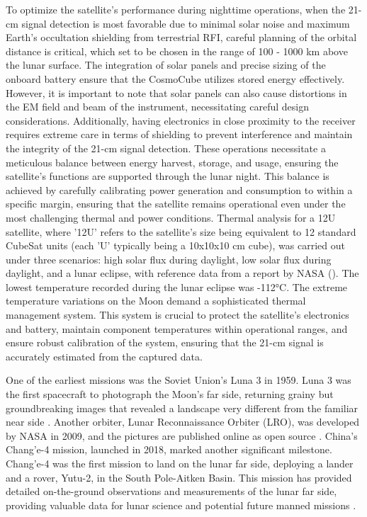 \documentclass[fleqn,usenatbib]{rasti}
\begin{document}
To optimize the satellite's performance during nighttime operations, when the 21-cm signal detection is most favorable due to minimal solar noise and maximum Earth's occultation shielding from terrestrial RFI, careful planning of the orbital distance is critical, which set to be chosen in the range of 100 - 1000 km above the lunar surface. The integration of solar panels and precise sizing of the onboard battery ensure that the CosmoCube utilizes stored energy effectively. However, it is important to note that solar panels can also cause distortions in the EM field and beam of the instrument, necessitating careful design considerations. Additionally, having electronics in close proximity to the receiver requires extreme care in terms of shielding to prevent interference and maintain the integrity of the 21-cm signal detection. These operations necessitate a meticulous balance between energy harvest, storage, and usage, ensuring the satellite's functions are supported through the lunar night. This balance is achieved by carefully calibrating power generation and consumption to within a specific margin, ensuring that the satellite remains operational even under the most challenging thermal and power conditions. Thermal analysis for a 12U satellite, where '12U' refers to the satellite's size being equivalent to 12 standard CubeSat units (each 'U' typically being a 10x10x10 cm cube), was carried out under three scenarios: high solar flux during daylight, low solar flux during daylight, and a lunar eclipse, with reference data from a report by NASA (\citeyear{NASA2019DSNE}). The lowest temperature recorded during the lunar eclipse was -112°C. The extreme temperature variations on the Moon demand a sophisticated thermal management system. This system is crucial to protect the satellite’s electronics and battery, maintain component temperatures within operational ranges, and ensure robust calibration of the system, ensuring that the 21-cm signal is accurately estimated from the captured data.

One of the earliest missions was the Soviet Union’s Luna 3 in 1959. Luna 3 was the first spacecraft to photograph the Moon’s far side, returning grainy but groundbreaking images that revealed a landscape very different from the familiar near side \citep{Lipsky1962}. Another orbiter, Lunar Reconnaissance Orbiter (LRO), was developed by NASA in 2009, and the pictures are published online as open source \citep{Tooley2010}. China’s Chang’e-4 mission, launched in 2018, marked another significant milestone. Chang’e-4 was the first mission to land on the lunar far side, deploying a lander and a rover, Yutu-2, in the South Pole-Aitken Basin. This mission has provided detailed on-the-ground observations and measurements of the lunar far side, providing valuable data for lunar science and potential future manned missions \citep{Li2019}. 
\end{document}
